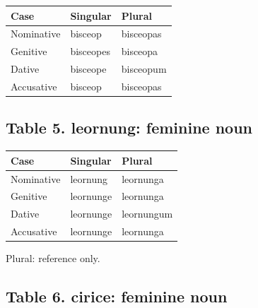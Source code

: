 \par\begingroup
\fontsize{10.5}{13.2}\selectfont
\setlength{\LTleft}{0pt}\setlength{\LTright}{\fill}
\noindent
\begin{tabular}{@{}>{\raggedright\arraybackslash}p{39.46mm}>{\raggedright\arraybackslash}p{39.46mm}>{\raggedright\arraybackslash}p{39.46mm}@{}}
\toprule
\textbf{Case} & \textbf{Singular} & \textbf{Plural} \\
\midrule
Nominative & bisceop & bisceopas \\
Genitive & bisceopes & bisceopa \\
Dative & bisceope & bisceopum \\
Accusative & bisceop & bisceopas \\
\bottomrule
\end{tabular}
\par\endgroup

\subsection*{Table 5. leornung: feminine noun}

\par\begingroup
\fontsize{10.5}{13.2}\selectfont
\setlength{\LTleft}{0pt}\setlength{\LTright}{\fill}
\noindent
\begin{tabular}{@{}>{\raggedright\arraybackslash}p{39.46mm}>{\raggedright\arraybackslash}p{39.46mm}>{\raggedright\arraybackslash}p{39.46mm}@{}}
\toprule
\textbf{Case} & \textbf{Singular} & \textbf{Plural} \\
\midrule
Nominative & leornung & leornunga \\
Genitive & leornunge & leornunga \\
Dative & leornunge & leornungum \\
Accusative & leornunge & leornunga \\
\bottomrule
\end{tabular}
\par\endgroup

Plural: reference only.

\subsection*{Table 6. cirice: feminine noun}

